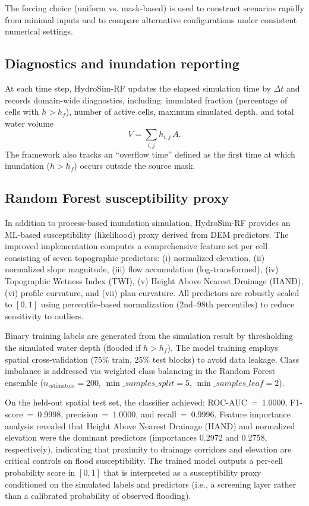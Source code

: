 \documentclass[a4paper,fleqn]{cas-sc}
\begin{document}
The forcing choice (uniform vs. mask-based) is used to construct scenarios rapidly from minimal inputs and to compare alternative configurations under consistent numerical settings.

\subsection{Diagnostics and inundation reporting}\label{subsec:methodology_diagnostics}
At each time step, HydroSim-RF updates the elapsed simulation time by $\Delta t$ and records domain-wide diagnostics, including: inundated fraction (percentage of cells with $h > h_f$), number of active cells, maximum simulated depth, and total water volume
\begin{equation}
V = \sum_{i,j} h_{i,j}\,A.
\end{equation}
The framework also tracks an ``overflow time'' defined as the first time at which inundation ($h > h_f$) occurs outside the source mask.

\subsection{Random Forest susceptibility proxy}\label{subsec:methodology_ml}
In addition to process-based inundation simulation, HydroSim-RF provides an ML-based susceptibility (likelihood) proxy derived from DEM predictors. The improved implementation computes a comprehensive feature set per cell consisting of seven topographic predictors: (i) normalized elevation, (ii) normalized slope magnitude, (iii) flow accumulation (log-transformed), (iv) Topographic Wetness Index (TWI), (v) Height Above Nearest Drainage (HAND), (vi) profile curvature, and (vii) plan curvature. All predictors are robustly scaled to $[0,1]$ using percentile-based normalization (2nd--98th percentiles) to reduce sensitivity to outliers.

Binary training labels are generated from the simulation result by thresholding the simulated water depth (flooded if $h > h_f$). The model training employs spatial cross-validation (75\% train, 25\% test blocks) to avoid data leakage. Class imbalance is addressed via weighted class balancing in the Random Forest ensemble ($n_{\text{estimators}}=200$, $\min\_samples\_split=5$, $\min\_samples\_leaf=2$).

On the held-out spatial test set, the classifier achieved: ROC-AUC~=~1.0000, F1-score~=~0.9998, precision~=~1.0000, and recall~=~0.9996. Feature importance analysis revealed that Height Above Nearest Drainage (HAND) and normalized elevation were the dominant predictors (importances 0.2972 and 0.2758, respectively), indicating that proximity to drainage corridors and elevation are critical controls on flood susceptibility. The trained model outputs a per-cell probability score in $[0,1]$ that is interpreted as a susceptibility proxy conditioned on the simulated labels and predictors (i.e., a screening layer rather than a calibrated probability of observed flooding).
\end{document}
